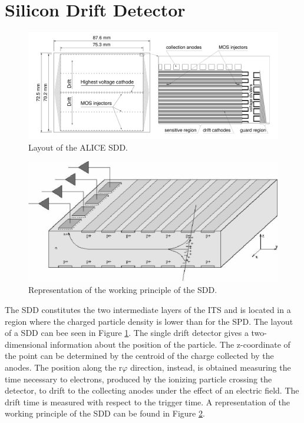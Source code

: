 \section{Silicon Drift Detector}
\begin{figure}
  \centering
  \includegraphics[scale=0.30]{figures/SDD.png}
  \caption{Layout of the ALICE SDD.}
  \label{fig:SDD}
\end{figure}
%
\begin{figure}
  \centering
  \includegraphics[scale=0.25]{figures/sddw.png}
  \caption{Representation of the working principle of the SDD.}
  \label{fig:sddw}
\end{figure}
%
The SDD constitutes the two intermediate layers of the ITS and is located in a region where the charged particle density is lower than for the SPD. The layout of a SDD can bee seen in Figure \ref{fig:SDD}. The single drift detector gives a two-dimensional information about the position of the particle. The z-coordinate of the point can be determined by the centroid of the charge collected by the anodes. The position along the r$\varphi$ direction, instead, is obtained measuring the time necessary to electrons, produced by the ionizing particle crossing the detector, to drift to the collecting anodes under the effect of an electric field. The drift time is measured with respect to the trigger time. A representation of the working principle of the SDD can be found in Figure \ref{fig:sddw}.\\
